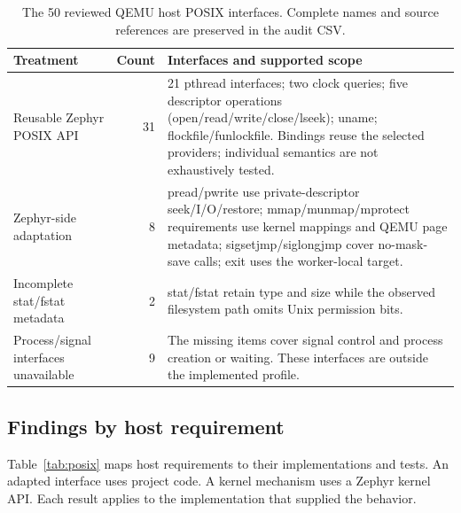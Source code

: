 \documentclass[10pt,a4paper,twocolumn]{article}
\begin{document}
\begin{table}[t]
\caption{The 50 reviewed QEMU host POSIX interfaces. Complete names and
source references are preserved in the audit CSV.}
\label{tab:audit-counts}
\small
\begin{tabularx}{\textwidth}{@{}>{\raggedright\arraybackslash}p{}rY@{}}
\toprule
Treatment & Count & Interfaces and supported scope\\
\midrule
Reusable Zephyr POSIX API & 31 & 21 pthread interfaces; two clock queries; five descriptor
operations (open/read/write/close/lseek); uname; flockfile/funlockfile.
Bindings reuse the selected providers; individual semantics are not exhaustively tested.\\
Zephyr-side adaptation & 8 & pread/pwrite use private-descriptor seek/I/O/restore;
mmap/munmap/mprotect requirements use kernel mappings and QEMU page metadata;
sigsetjmp/siglongjmp cover no-mask-save calls; exit uses the worker-local target.\\
Incomplete stat/fstat metadata & 2 & stat/fstat retain type and size while the observed
filesystem path omits Unix permission bits.\\
Process/signal interfaces unavailable & 9 & The missing items cover signal
control and process creation or waiting. These interfaces are outside
the implemented profile.\\
\bottomrule
\end{tabularx}
\end{table}

\subsection{Findings by host requirement}

Table~\ref{tab:posix} maps host requirements to their implementations and
tests. An adapted interface uses project code. A kernel mechanism uses a
Zephyr kernel API. Each result applies to the implementation that supplied
the behavior.
\end{document}
